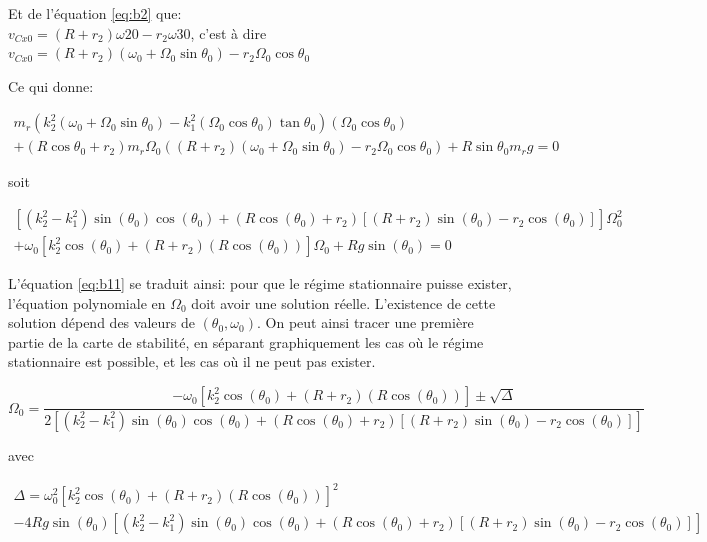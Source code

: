 Et de l'équation \ref{eq:b2} que:\\
$v_{Cx0}=(R+r_2)\omega{20}-r_2\omega{30}$, c'est à dire $v_{Cx0}=(R+r_2)(\omega_0 + \Omega_0 \sin{\theta_0})-r_2\Omega_0 \cos{\theta_0}$

Ce qui donne:

\begin{equation}
 \begin{split}
     m_r(k_2^2(\omega_0 + \Omega_0 \sin{\theta_0})-k_1^2(\Omega_0 \cos{\theta_0}) \tan{\theta_0})(\Omega_0 \cos{\theta_0})\\
    +(R\cos{\theta_0}+r_2)m_r \Omega_0 ((R+r_2)(\omega_0 + \Omega_0 \sin{\theta_0})-r_2\Omega_0 \cos{\theta_0}) + R\sin{\theta_0}m_r g =0
 \end{split}
  \label{eq:b11}
\end{equation}

soit

\begin{equation}
 \begin{split}
     [(k_2^2-k_1^2)\sin(\theta_0)\cos(\theta_0)+(R \cos(\theta_0)+r_2)[(R+r_2)\sin(\theta_0)-r_2 \cos(\theta_0)]]\Omega_0^2 \\
     +\omega_0[k_2^2 \cos(\theta_0)+(R+r_2)(R \cos(\theta_0))] \Omega_0 + R g \sin(\theta_0) =0
 \end{split}
  \label{eq:b12}
\end{equation}

L'équation \ref{eq:b11} se traduit ainsi: pour que le régime stationnaire puisse exister, l'équation polynomiale en $\Omega_0$ doit avoir une solution réelle. L'existence de cette solution dépend des valeurs de $(\theta_0,\omega_0)$. On peut ainsi tracer une première partie de la carte de stabilité, en séparant graphiquement les cas où le régime stationnaire est possible, et les cas où il ne peut pas exister.

\begin{equation}
 \Omega_0=\frac{-\omega_0[k_2^2 \cos(\theta_0)+(R+r_2)(R \cos(\theta_0))] \pm \sqrt{\Delta} }{2[(k_2^2-k_1^2)\sin(\theta_0)\cos(\theta_0)+(R \cos(\theta_0)+r_2)[(R+r_2)\sin(\theta_0)-r_2 \cos(\theta_0)]]}
  \label{eq:b13}
\end{equation}

avec 

\begin{equation}
 \begin{split}
 \Delta=\omega_0^2[k_2^2 \cos(\theta_0)+(R+r_2)(R \cos(\theta_0))]^2 \\
 -4 R g \sin(\theta_0)[(k_2^2-k_1^2)\sin(\theta_0)\cos(\theta_0)+(R \cos(\theta_0)+r_2)[(R+r_2)\sin(\theta_0)-r_2 \cos(\theta_0)]]
 \end{split}
  \label{eq:b14}
\end{equation}

